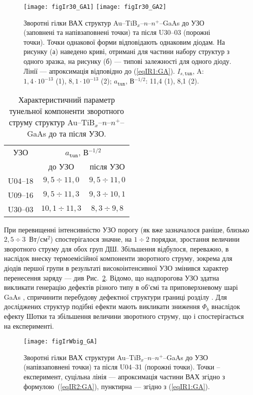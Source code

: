 \documentclass[a4paper,14pt,oneside,openany]{memoir}
\begin{document}
\begin{figure}
\center
\texttt{[image: figIr30\_GA1]} \hfill
\texttt{[image: figIr30\_GA2]}
\caption{\label{figIr30_GA}
Зворотні гілки ВАХ структур Au--TiB$_x$--$n$--$n^+$--GaAs
до УЗО (заповнені та напівзаповнені точки)
та після U30--03 (порожні точки).
Точки однакової форми відповідають однаковим діодам.
На рисунку (а) наведено криві, отримані для частини набору структур з одного зразка,
на рисунку (б) --- типові залежності для одного діоду.
Лінії --- апроксимація відповідно до (\ref{eqIR1:GA}).
$I_{s,\mathtt{tun}}$, A: $1,4\cdot10^{-13}$ (1), $8,1\cdot10^{-13}$ (2);
$a_\mathtt{tun}$, В$^{-1/2}$: 11,4 (1), 8,1 (2).
}%
\end{figure}

\begin{table}
\caption{\label{tabUS_GaAs}Характеристичний параметр тунельної компоненти
зворотного струму структур Au--TiB$_x$--$n$--$n^+$--GaAs до та після УЗО.
}
\center
\begin{tabular}{|c|c|c|}
\hline
УЗО&\multicolumn{2}{c|}{$a_\mathtt{tun}$, В$^{-1/2}$}\\ \cline{2-3}
& до УЗО & після УЗО \\
\hline
U04--18&$9,5\div11,0$&$9,5\div11,0$\\ \hline
U09--16&$9,5\div11,3$&$9,3\div10,1$\\ \hline
U30--03&$10,1\div11,3$&$8,3\div9,8$\\ \hline
\end{tabular}
\end{table}


При перевищенні інтенсивністю  УЗО порогу (як вже зазначалося раніше, близько $2,5\div3$~Вт/см$^2$) спостерігалося значне, на $1\div2$ порядки,
зростання величини зворотного струму для обох груп ДШ.
Збільшення відбулося, переважно, в наслідок внеску термоемісійної компоненти зворотного струму, зокрема для діодів першої групи в результаті високоінтенсивної УЗО
змінився характер перенесення заряду --- див Рис.~\ref{figIrWbig_GA}.
Відомо, що надпорогова УЗО здатна викликати генерацію дефектів різного типу в об’ємі та приповерхневому шарі GaAs \cite{Zaver},
спричинити перебудову дефектної структури границі розділу \cite{Parchinskii2003r}.
Для досліджених структур подібні ефекти мають викликати зниження $\Phi_b$ внаслідок ефекту Шотки та збільшення величини зворотного струму, що і спостерігається на експерименті.


\begin{figure}
\center
\texttt{[image: figIrWbig\_GA]}%
\caption{\label{figIrWbig_GA}
Зворотні гілки ВАХ структури Au--TiB$_x$--$n$--$n^+$--GaAs
до УЗО (напівзаповнені точки)
та після U04--31 (порожні точки).
Точки -- експеримент,
суцільна лінія --- апроксимація частини ВАХ згідно з формулою~(\ref{eqIR2:GA}),
пунктирна  --- згідно з (\ref{eqIR1:GA}).
}%
\end{figure}
\end{document}
